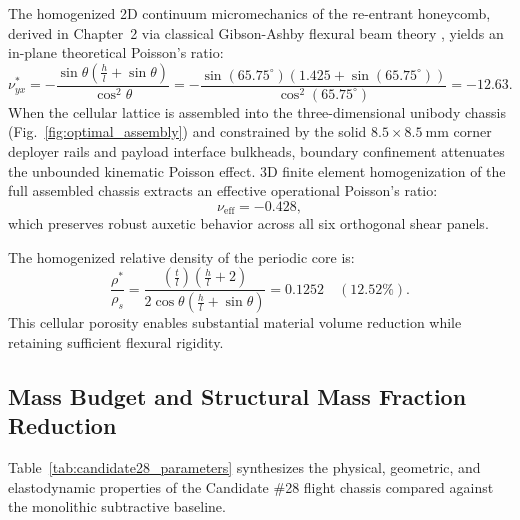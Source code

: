 The homogenized 2D continuum micromechanics of the re-entrant honeycomb, derived in Chapter~2 via classical Gibson-Ashby flexural beam theory \cite{gibson1997}, yields an in-plane theoretical Poisson's ratio:
\begin{equation}
\nu_{yx}^* = -\frac{\sin\theta \left( \frac{h}{l} + \sin\theta \right)}{\cos^2\theta} = -\frac{\sin(65.75^\circ) \left( 1.425 + \sin(65.75^\circ) \right)}{\cos^2(65.75^\circ)} = -12.63.
\label{eq:ch6_poisson_2d}
\end{equation}
When the cellular lattice is assembled into the three-dimensional unibody chassis (Fig.~\ref{fig:optimal_assembly}) and constrained by the solid $8.5 \times \SI{8.5}{\milli\meter}$ corner deployer rails and payload interface bulkheads, boundary confinement attenuates the unbounded kinematic Poisson effect. 3D finite element homogenization of the full assembled chassis extracts an effective operational Poisson's ratio:
\begin{equation}
\nu_{\text{eff}} = -0.428,
\label{eq:poisson_3d_eff}
\end{equation}
which preserves robust auxetic behavior across all six orthogonal shear panels.

The homogenized relative density of the periodic core is:
\begin{equation}
\frac{\rho^*}{\rho_s} = \frac{\left( \frac{t}{l} \right) \left( \frac{h}{l} + 2 \right)}{2 \cos\theta \left( \frac{h}{l} + \sin\theta \right)} = 0.1252 \quad (12.52\%).
\label{eq:rel_density}
\end{equation}
This cellular porosity enables substantial material volume reduction while retaining sufficient flexural rigidity.

\subsection{Mass Budget and Structural Mass Fraction Reduction}

Table~\ref{tab:candidate28_parameters} synthesizes the physical, geometric, and elastodynamic properties of the Candidate \#28 flight chassis compared against the monolithic subtractive baseline.

